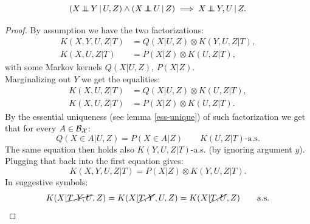 \begin{Lem}
    \[ (X \operatorname*{\perp\mkern-11mu\perp}  Y \operatorname*{|} U , Z) \land (X \operatorname*{\perp\mkern-11mu\perp}  U \operatorname*{|} Z)  \implies X \operatorname*{\perp\mkern-11mu\perp}  Y , U \operatorname*{|} Z.\]
\begin{proof}
 By assumption we have the two factorizations:
    \begin{align*}
        K(X,Y,U,Z|T) & = Q(X|U,Z) \otimes K(Y,U,Z|T),\\
        K(X,U,Z|T) & = P(X|Z) \otimes K(U,Z|T),
    \end{align*}
    with some Markov kernels $Q(X|U,Z)$, $P(X|Z)$.\\
    Marginalizing out $Y$ we get the equalities:
    \begin{align*}
        K(X,U,Z|T) & = Q(X|U,Z) \otimes K(U,Z|T),\\
        K(X,U,Z|T) & = P(X|Z) \otimes K(U,Z|T).
    \end{align*}
    By the essential uniqueness (see lemma \ref{ess-unique}) of such factorization we get that for every $A \in \mathcal{B}_{\mathcal{X}}$:
\[ Q(X \in A|U,Z) = P(X \in A|Z) \qquad K(U,Z|T)\text{-a.s.}\]
The same equation then holds also $K(Y,U,Z|T)$-a.s. (by ignoring argument $y$).
Plugging that back into the first equation gives:
\[ K(X,Y,U,Z|T) = P(X|Z) \otimes K(Y,U,Z|T).\]
In suggestive symbols:
\[ K(X|\cancel{T,Y,U},Z) = K(X|\cancel{T,Y},U,Z) =  K(X|\cancel{T,U},Z) \qquad \text{a.s.}\]
\end{proof}
\end{Lem}

